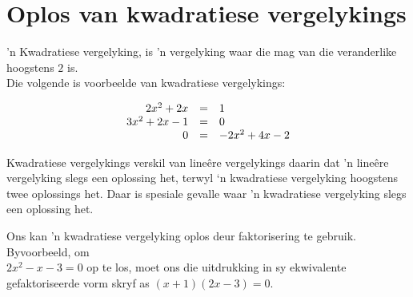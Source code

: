 \section{Oplos van kwadratiese vergelykings}

’n Kwadratiese vergelyking, is ’n vergelyking waar die mag van die veranderlike hoogstens
$2$ is. \\Die volgende is voorbeelde van kwadratiese vergelykings:\par 


\begin{equation*}
    \begin{array}{ccl}\hfill 2{x}^{2}+2x& =& 1\hfill \\
	\hfill 3{x}^{2}+2x-1&=&0 \\ 
	\hfill 0&=&-2{x}^{2}+4x-2\hfill 
    \end{array}
\end{equation*}

Kwadratiese vergelykings verskil van lineêre vergelykings daarin dat ’n lineêre vergelyking slegs een oplossing
het, terwyl ‘n kwadratiese vergelyking hoogstens twee oplossings het. Daar is spesiale gevalle waar ’n kwadratiese
vergelyking slegs een oplossing het.\par


Ons kan 'n kwadratiese vergelyking oplos deur faktorisering te gebruik. Byvoorbeeld, om \\$2{x}^{2}-x-3 = 0$ op te los, moet ons die uitdrukking in sy ekwivalente gefaktoriseerde vorm skryf as $(x+1)(2x-3)=0$.\par




